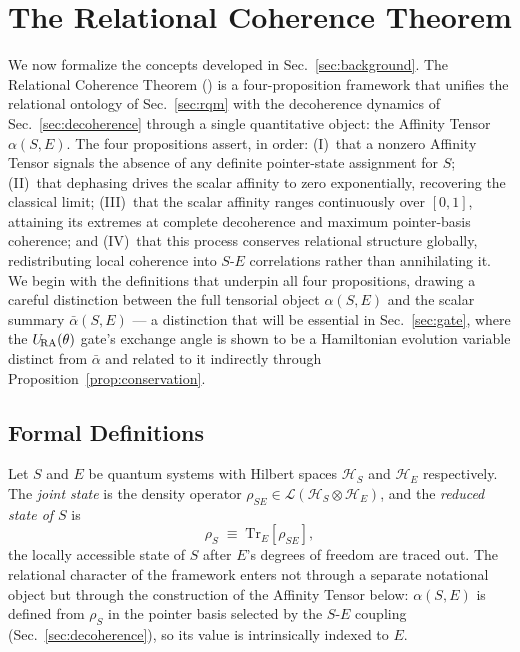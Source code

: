 %

\section{\label{sec:rct}The Relational Coherence Theorem}

We now formalize the concepts developed in Sec.~\ref{sec:background}.
The Relational Coherence Theorem (\RCT) is a four-proposition
framework that unifies the relational ontology of
Sec.~\ref{sec:rqm} with the decoherence dynamics of
Sec.~\ref{sec:decoherence} through a single quantitative object:
the Affinity Tensor $\alpha(S,E)$.
The four propositions assert, in order: (I)~that a nonzero Affinity
Tensor signals the absence of any definite pointer-state assignment
for $S$; (II)~that dephasing drives the scalar affinity to zero
exponentially, recovering the classical limit; (III)~that the scalar
affinity ranges continuously over $[0,1]$, attaining its extremes at
complete decoherence and maximum pointer-basis coherence; and
(IV)~that this process conserves relational structure globally,
redistributing local coherence into $S$-$E$ correlations rather than
annihilating it.
We begin with the definitions that underpin all four propositions,
drawing a careful distinction between the full tensorial object
$\alpha(S,E)$ and the scalar summary $\bar{\alpha}(S,E)$ --- a
distinction that will be essential in Sec.~\ref{sec:gate}, where the
$U_{\!\mathrm{RA}}(\theta)$ gate's exchange angle is shown to be a Hamiltonian
evolution variable distinct from $\bar{\alpha}$ and related to it
indirectly through Proposition~\ref{prop:conservation}.


\subsection{\label{sec:definitions}Formal Definitions}

\begin{definition}
\label{def:rho}
Let $S$ and $E$ be quantum systems with Hilbert spaces
$\mathcal{H}_S$ and $\mathcal{H}_E$ respectively.
The \emph{joint state} is the density operator
$\rho_{SE} \in \mathcal{L}(\mathcal{H}_S \otimes \mathcal{H}_E)$,
and the \emph{reduced state of $S$} is
\begin{equation}
\label{eq:rho-def}
  \rho_S \;\equiv\; \mathrm{Tr}_E[\rho_{SE}],
\end{equation}
the locally accessible state of $S$ after $E$'s degrees of freedom
are traced out.
The relational character of the framework enters not through a
separate notational object but through the construction of the
Affinity Tensor below: $\alpha(S,E)$ is defined from $\rho_S$ in
the pointer basis selected by the $S$-$E$ coupling
(Sec.~\ref{sec:decoherence}), so its value is intrinsically indexed
to $E$.
\end{definition}

